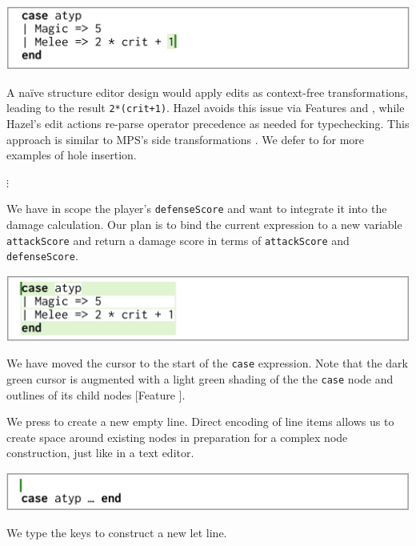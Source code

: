 \documentclass[format=sigplan,dvipsnames,backend=bibtex]{acmart}
\newcommand{\Hazel}{\textsf{Hazel}\xspace}
\newcommand{\key}[1]{\fbox{\texttt{#1}}}
\begin{document}
{\centering
  \includegraphics[width=\linewidth]{fig/frame2.png}\par
}
\noindent
A naïve structure editor design would apply edits as context-free transformations,
	leading to the result \texttt{2*(crit+1)}.
\Hazel avoids this issue via Features  and , while \Hazel's edit actions
	re-parse operator precedence as needed for typechecking.
This approach is similar to MPS's side transformations \cite{GrammarCells}.
We defer to \cite{Hazelnut} for more examples of hole insertion.

{\centering
	\vspace{-0.1cm}
  $\vdots$\par
  \vspace{0.1cm}
}
\noindent
We have in scope the player's \texttt{defenseScore}
	and want to integrate it into the damage calculation.
Our plan is to bind the current expression to a new variable \texttt{attackScore}
	and return a damage score in terms of \texttt{attackScore} and \texttt{defenseScore}.

{\centering
  \includegraphics[width=\linewidth]{fig/frame3.png}\par
}
\noindent
We have moved the cursor to the start of the \texttt{case} expression.
Note that the dark green cursor is augmented with a light green shading of the
	the \texttt{case} node and outlines of its child nodes [Feature ].
	
We press \key{Enter} to create a new empty line.
Direct encoding of line items allows us to create space around existing nodes
	in preparation for a complex node construction, just like in a text editor.

{\centering
  \includegraphics[width=\linewidth]{fig/frame4.png}\par
}
\noindent
We type the keys \key{l} \key{e} \key{t} \key{Space} to construct a new let line.
\end{document}
